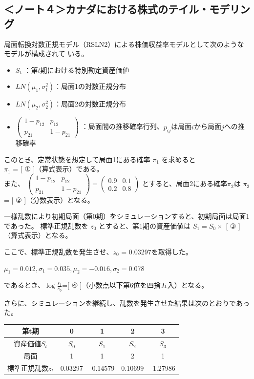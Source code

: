 \documentclass[report,gutter=10mm,fore-edge=10mm,uplatex,dvipdfmx]{jlreq}
\begin{document}
{\subsection{＜ノート４＞カナダにおける株式のテイル・モデリング}

局面転換対数正規モデル（RSLN2）による株価収益率モデルとして次のようなモデルが構成されて
いる。
\begin{itemize}
\item $S_t$ ：第$t$期における特別勘定資産価値
\item $LN(\mu_1,\sigma^2_1)$：局面1の対数正規分布
\item $LN(\mu_2,\sigma^2_2)$：局面2の対数正規分布
\item $\begin{pmatrix}
 1 - p_{12} & p_{12} \\
 p_{21} & 1 - p_{21}
 \end{pmatrix}$ ：局面間の推移確率行列、$p_{ij}$は局面$i$から局面$j$への推移確率
\end{itemize}

このとき、定常状態を想定して局面1にある確率 $\pi_{1}$ を求めると\\
$\pi_1$ = [ ① ]（算式表示）である。\\
また、
$\begin{pmatrix}
1 - p_{12} & p_{12} \\
p_{21} & 1 - p_{21}
\end{pmatrix}
=
\begin{pmatrix}
0.9 &0.1 \\
0.2 & 0.8
\end{pmatrix}$
とすると、局面2にある確率$\pi_2$は
$\pi_2$ = [ ② ]（分数表示）となる。

一様乱数により初期局面（第0期）をシミュレーションすると、初期局面は局面1であった。
標準正規乱数を $z_0$ とすると、第1期の資産価値は
$S_1=S_0\times$ [ ③ ]（算式表示）となる。

ここで、標準正規乱数を発生させ、$z_0$ = 0.03297を取得した。

$ \mu_1= 0.012, \sigma_1 = 0.035, \mu_2 = -0.016, \sigma_2 = 0.078$

であるとき、$\log{\frac{s_1}{s_0}}$=[ ④ ]（小数点以下第6位を四捨五入）となる。

さらに、シミュレーションを継続し、乱数を発生させた結果は次のとおりであった。

\begin{tabular}{|c|c|c|c|c|}
\hline 第t期&0&1&2&3\\ \hline
 資産価値$S_t$&$S_0$&$S_1$&$S_2$&$S_3$\\ \hline
 局面&1&1&2&1\\ \hline
 標準正規乱数$z_t$&0.03297&-0.14579&0.10699&-1.27986\\ \hline
\end{tabular}

}
\end{document}
